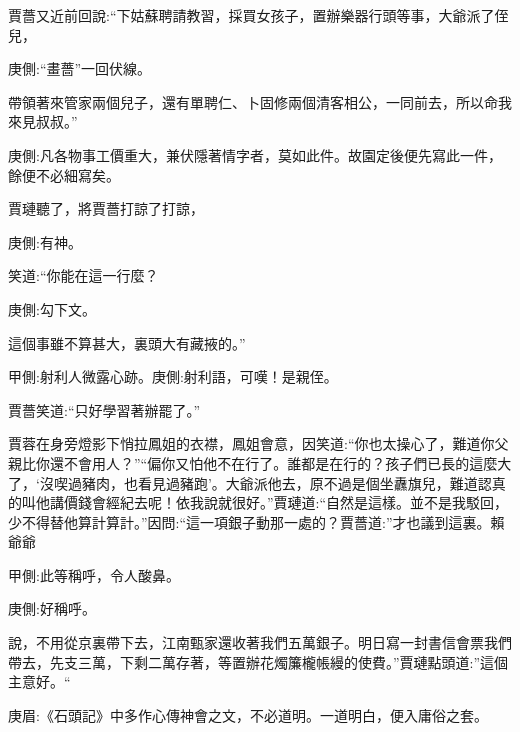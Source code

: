 \begin{parag}
    賈薔又近前回說:“下姑蘇聘請教習，採買女孩子，置辦樂器行頭等事，大爺派了侄兒，\begin{note}庚側:“畫薔”一回伏線。\end{note}帶領著來管家兩個兒子，還有單聘仁、卜固修兩個清客相公，一同前去，所以命我來見叔叔。”\begin{note}庚側:凡各物事工價重大，兼伏隱著情字者，莫如此件。故園定後便先寫此一件，餘便不必細寫矣。\end{note}賈璉聽了，將賈薔打諒了打諒，\begin{note}庚側:有神。\end{note}笑道:“你能在這一行麼？\begin{note}庚側:勾下文。\end{note}這個事雖不算甚大，裏頭大有藏掖的。”\begin{note}甲側:射利人微露心跡。庚側:射利語，可嘆！是親侄。\end{note}賈薔笑道:“只好學習著辦罷了。”
\end{parag}


\begin{parag}
    賈蓉在身旁燈影下悄拉鳳姐的衣襟，鳳姐會意，因笑道:“你也太操心了，難道你父親比你還不會用人？”“偏你又怕他不在行了。誰都是在行的？孩子們已長的這麼大了，‘沒喫過豬肉，也看見過豬跑’。大爺派他去，原不過是個坐纛旗兒，難道認真的叫他講價錢會經紀去呢！依我說就很好。”賈璉道:“自然是這樣。並不是我駁回，少不得替他算計算計。”因問:“這一項銀子動那一處的？賈薔道:”才也議到這裏。賴爺爺\begin{note}甲側:此等稱呼，令人酸鼻。\end{note}\begin{note}庚側:好稱呼。\end{note}說，不用從京裏帶下去，江南甄家還收著我們五萬銀子。明日寫一封書信會票我們帶去，先支三萬，下剩二萬存著，等置辦花燭簾櫳帳縵的使費。”賈璉點頭道:”這個主意好。“\begin{note}庚眉:《石頭記》中多作心傳神會之文，不必道明。一道明白，便入庸俗之套。\end{note}
\end{parag}


